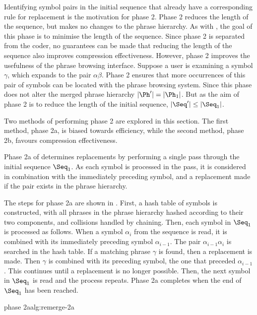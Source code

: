 Identifying symbol pairs in the initial sequence that already 
have a
corresponding rule for replacement is the motivation for
phase 2.  Phase 2 reduces the length of the sequence, but makes
no changes to the phrase hierarchy.  As with \repair, the goal
of this phase is to minimise the length of the sequence.  Since
phase 2 is separated from the coder, no guarantees can be made
that reducing the length of the sequence also improves compression
effectiveness.
However, phase 2 improves the usefulness of the phrase browsing
interface.
Suppose a user is examining a symbol $\gamma$, which expands
to the pair $\alpha$$\beta$.  Phase 2 ensures that more  
occurrences of this pair of symbols can be located with the
phrase browsing system.  Since this phase does
not alter the merged phrase hierarchy $|\Ph'| = |\Ph_1|$.  But
as the
aim of phase 2 is to reduce the length of the initial sequence,
$|\Seq'| \leq |\Seq_1|$.

Two methods of performing
phase 2 are explored in this section.  The first method, phase
2a, is biased towards efficiency, while the second method, phase
2b, favours compression effectiveness.  


Phase 2a of \remerge determines replacements by performing a
single pass through the initial sequence $\Seq_1$.  As each 
symbol is processed in the pass, it is considered in combination 
with the immediately preceding symbol, and a replacement made
if the pair exists in the phrase hierarchy.

The steps for phase 2a are shown in .
First, a hash table of symbols is constructed,
with all phrases in the phrase hierarchy hashed
according to their two components, and collisions
handled by chaining.  Then, each symbol in $\Seq_1$
is processed as follows.  When a symbol $\alpha_i$ from the sequence 
is read, it is combined with its immediately preceding symbol
$\alpha_{i-1}$.  The pair $\alpha_{i-1}$$\alpha_i$ is 
searched in the hash table.
If a matching phrase $\gamma$ is found, then a
replacement is made.  Then $\gamma$ is combined
with its preceding symbol, the one that preceded $\alpha_{i-1}$.  
This continues until a replacement is no longer possible.  
Then, the next symbol 
in $\Seq_1$ is read and the process repeats.  Phase 2a completes 
when the end of $\Seq_1$ has been reached.  

{\remerge phase 2a}{alg:remerge-2a}


